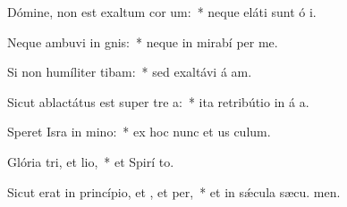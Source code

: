 \item Dómine, non est exaltum cor um:~* neque eláti sunt ó i.
\item Neque ambuvi in gnis:~* neque in mirabí per me.
\item Si non humíliter tibam:~* sed exaltávi á am.
\item Sicut ablactátus est super tre a:~* ita retribútio in á a.
\item Speret Isra in mino:~* ex hoc nunc et us  culum.
\item Glória tri, et lio,~* et Spirí to.
\item Sicut erat in princípio, et , et per,~* et in sǽcula sæcu. men.

